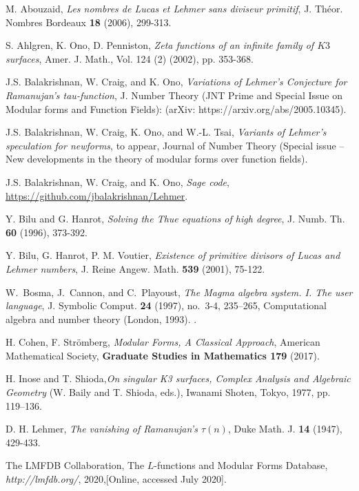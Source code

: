 \documentclass[12pt]{amsart}
\numberwithin{equation}{section}
\begin{document}
\begin{thebibliography}{99}

 M. Abouzaid, \emph{Les nombres de Lucas et Lehmer sans diviseur primitif},
J. Th\'eor. Nombres Bordeaux \textbf{18} (2006), 299-313.

 S. Ahlgren, K. Ono, D. Penniston, \emph{Zeta functions of an infinite family of $K3$ surfaces}, Amer. J. Math., Vol. 124 (2) (2002), pp. 353-368.

 J.\thinspace{}S. Balakrishnan, W.  Craig, and K. Ono, \emph{Variations of Lehmer's Conjecture for Ramanujan's tau-function}, J. Number Theory (JNT Prime and Special Issue on Modular forms and Function Fields): (arXiv: https://arxiv.org/abs/2005.10345).

 J.\thinspace{}S. Balakrishnan, W.  Craig, K. Ono, and W.-L. Tsai, \emph{Variants of Lehmer's speculation for newforms}, to appear, Journal of Number Theory (Special issue – New developments in the theory of modular forms over function fields).

 J.\thinspace{}S. Balakrishnan, W. Craig, and K. Ono, \emph{Sage code},  \url{https://github.com/jbalakrishnan/Lehmer}.


 Y. Bilu and G. Hanrot, \emph{Solving the Thue equations of high degree}, J. Numb. Th.
\textbf{60} (1996), 373-392.

 Y. Bilu, G. Hanrot, P. M. Voutier, \emph{Existence of primitive divisors of Lucas and Lehmer numbers},
J. Reine Angew. Math.  \textbf{539} (2001), 75-122.

W.~Bosma, J.~Cannon, and C.~Playoust, \emph{The {M}agma algebra system. {I}.
  {T}he user language}, J. Symbolic Comput. \textbf{24} (1997), no.~3-4,
  235--265, Computational algebra and number theory (London, 1993). .
  
 H. Cohen, F. Strömberg, \emph{Modular Forms, A Classical Approach}, American Mathematical Society, \textbf{Graduate Studies in Mathematics 179} (2017).

 H. Inose and T. Shioda,\emph{On singular K3 surfaces, Complex Analysis and Algebraic Geometry} (W.
Baily and T. Shioda, eds.), Iwanami Shoten, Tokyo, 1977, pp. 119–136.

 D. H. Lehmer, \emph{The vanishing of Ramanujan's $\tau(n)$}, Duke Math. J.
\textbf{14} (1947), 429-433.

 The LMFDB Collaboration, The $L$-functions and Modular Forms Database, \emph{http://lmfdb.org/}, 2020,[Online, accessed July 2020].


\end{thebibliography}
\end{document}
